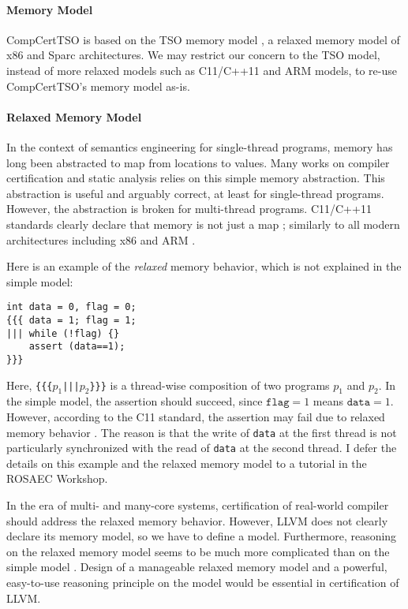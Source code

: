 \documentclass[nocopyrightspace]{sigplanconf}
\begin{document}
\paragraph{Memory Model}
CompCertTSO is based on the TSO memory model \cite{TODO}, a relaxed
memory model of x86 and Sparc architectures.  We may restrict our
concern to the TSO model, instead of more relaxed models such as
C11/C++11 and ARM models, to re-use CompCertTSO's memory model as-is.

\paragraph{Relaxed Memory Model}\label{sec:relaxed}
In the context of semantics engineering for single-thread programs,
memory has long been abstracted to map from locations to values.  Many
works on compiler certification and static analysis relies on this
simple memory abstraction.  This abstraction is useful and arguably
correct, at least for single-thread programs.  However, the
abstraction is broken for multi-thread programs.  C11/C++11 standards
clearly declare that memory is not just a map \cite{TODO}; similarly
to all modern architectures including x86 \cite{TODO} and ARM
\cite{TODO}.

Here is an example of the \emph{relaxed} memory behavior, which is not
explained in the simple model:
\begin{verbatim}
int data = 0, flag = 0;
{{{ data = 1; flag = 1;
||| while (!flag) {}
    assert (data==1);
}}}
\end{verbatim}
Here, \texttt{\{\{\{$p_1$|||$p_2$\}\}\}} is a thread-wise composition
of two programs $p_1$ and $p_2$.  In the simple model, the assertion
should succeed, since $\texttt{flag}=1$ means $\texttt{data}=1$.
However, according to the C11 standard, the assertion may fail due to
relaxed memory behavior \cite{TODO}.  The reason is that the write of
\texttt{data} at the first thread is not particularly synchronized
with the read of \texttt{data} at the second thread.  I defer the
details on this example and the relaxed memory model to a tutorial in
the ROSAEC Workshop.

In the era of multi- and many-core systems, certification of
real-world compiler should address the relaxed memory behavior.
However, LLVM does not clearly declare its memory model, so we have to
define a model.  Furthermore, reasoning on the relaxed memory model
seems to be much more complicated than on the simple model
\cite{TODO}.  Design of a manageable relaxed memory model and a
powerful, easy-to-use reasoning principle on the model would be
essential in certification of LLVM.
\end{document}
